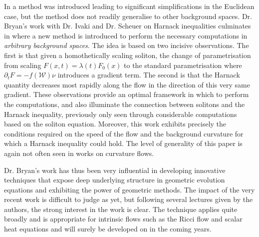 \documentclass[12pt]{amsart}
\begin{document}
In \cite{MR1296393} a method was introduced leading to significant simplifications in the Euclidean case, but the method does not readily generalise to other background spaces. Dr. Bryan's work with Dr. Ivaki and Dr. Scheuer on Harnack inequalities culminates in \cite{BIS4} where a new method is introduced to perform the necessary computations in \emph{arbitrary background spaces}. The idea is based on two incisive observations. The first is that given a homothetically scaling soliton, the change of parametrisation from scaling \(F(x, t) = \lambda(t) F_0(x)\) to the standard parametrisation where \(\partial_t F = -f(\mathcal{W})\nu\) introduces a gradient term. The second is that the Harnack quantity decreases most rapidly along the flow in the direction of this very same gradient. These observations provide an optimal framework in which to perform the computations, and also illuminate the connection between solitons and the Harnack inequality, previously only seen through considerable computations based on the soliton equation. Moreover, this work exhibits precisely the conditions required on the speed of the flow and the background curvature for which a Harnack inequality could hold. The level of generality of this paper is again not often seen in works on curvature flows.

Dr. Bryan's work has thus been very influential in developing innovative techniques that expose deep underlying structure in geometric evolution equations and exhibiting the power of geometric methods. The impact of the very recent work \cite{BIS4} is difficult to judge as yet, but following several lectures given by the authors, the strong interest in the work is clear. The technique applies quite broadly and is appropriate for intrinsic flows such as the Ricci flow and scalar heat equations and will surely be developed on in the coming years.

\printbibliography
\end{document}
